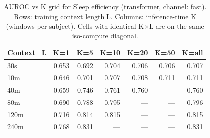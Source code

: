\begin{table}[ht]
\centering
\caption{AUROC vs K grid for Sleep efficiency (transformer, channel: fast). Rows: training context length L. Columns: inference-time K (windows per subject). Cells with identical K×L are on the same iso-compute diagonal.}
\label{tab:kgrid_sleep_efficiency_binary_transformer_fast}
\begin{tabular}{lrrrrrr}
\toprule
Context_L & K=1 & K=5 & K=10 & K=20 & K=50 & K=all \\
\midrule
30s & 0.653 & 0.692 & 0.704 & 0.706 & 0.706 & 0.707 \\
10m & 0.646 & 0.701 & 0.707 & 0.708 & 0.711 & 0.711 \\
40m & 0.659 & 0.746 & 0.761 & 0.760 & — & 0.760 \\
80m & 0.690 & 0.788 & 0.795 & — & — & 0.796 \\
120m & 0.716 & 0.814 & 0.815 & — & — & 0.815 \\
240m & 0.768 & 0.831 & — & — & — & 0.831 \\
\bottomrule
\end{tabular}
\end{table}